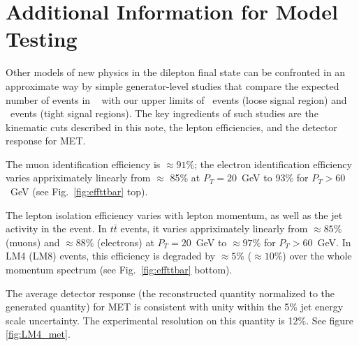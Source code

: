 \section{Additional Information for Model Testing}
\label{sec:outreach}

Other models of new physics in the dilepton final state can be confronted in an approximate way by simple 
generator-level studies that compare the expected number of events in \lumi~
with our upper limits of \ulloose~events (loose signal region) and \ultight~events 
(tight signal regions).  
The key ingredients of such studies are the kinematic cuts described 
in this note, the lepton efficiencies, and the detector response for MET.

The muon identification efficiency is $\approx 91\%$;
the electron identification efficiency varies appriximately linearly 
from $\approx$ 85\% at 
$P_T = 20$~GeV to 93\% for $P_T > 60$~GeV (see Fig.~\ref{fig:effttbar} top).

The lepton isolation efficiency varies with lepton momentum, as well as the jet activity in the event.
In $t\bar{t}$ events, it varies appriximately linearly from $\approx 85\%$ (muons)
and $\approx 88\%$ (electrons) at $P_T=20$~GeV to $\approx 97\%$ for $P_T>60$~GeV. 
In LM4 (LM8) events, this efficiency is degraded by $\approx 5$\% ($\approx 10$\%) over the whole momentum 
spectrum (see Fig.~\ref{fig:effttbar} bottom).

The average detector response (the reconstructed quantity normalized to the generated quantity) 
for MET is 
consistent with unity within the 5\% jet energy scale uncertainty.
The experimental resolution on this quantity is 12\%. See figure \ref{fig:LM4_met}.


